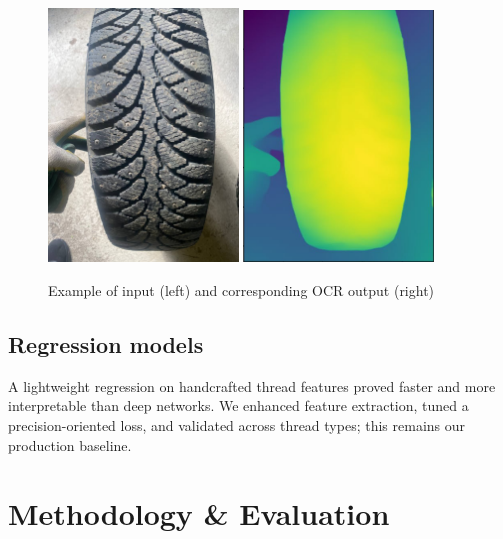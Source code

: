 \documentclass{article}
\begin{document}
\begin{figure}[H]
    \centering
    \includegraphics[width=0.45\textwidth]{assets/input.png}\hfill
    \includegraphics[width=0.45\textwidth]{assets/output.png}
    \caption{Example of input (left) and corresponding OCR output (right)}
    \label{fig:input_output}
\end{figure}

\subsection{Regression models}

A lightweight regression on handcrafted thread features proved faster and more interpretable than deep networks. We enhanced feature extraction, tuned a precision-oriented loss, and validated across thread types; this remains our production baseline.

\section{Methodology \& Evaluation}
\end{document}
